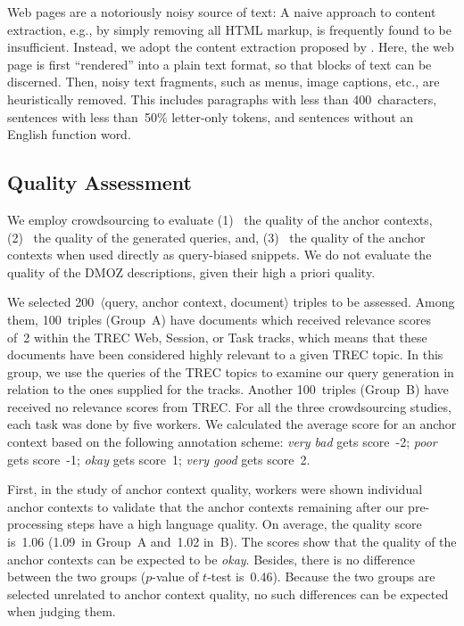 \documentclass[sigconf]{acmart}
\newcommand{\Ni}{(1)~}
\newcommand{\Nii}{(2)~}
\newcommand{\Niii}{(3)~}
\begin{document}
Web pages are a notoriously noisy source of text: A naive approach to content extraction, e.g., by simply removing all HTML markup, is frequently found to be insufficient. Instead, we adopt the content extraction proposed by \citet{kiesel:2017}. Here, the web page is first ``rendered'' into a plain text format, so that blocks of text can be discerned. Then, noisy text fragments, such as menus, image captions, etc., are heuristically removed. This includes paragraphs with less than 400~characters, sentences with less than~50\% letter-only tokens, and sentences without an English function word.

\subsection{Quality Assessment}

We employ crowdsourcing to evaluate
\Ni
the quality of the anchor contexts,
\Nii
the quality of the generated queries, and,
\Niii
the quality of the anchor contexts when used directly as query-biased snippets.
We do not evaluate the quality of the DMOZ descriptions, given their high a priori quality.

We selected 200~$\langle$query, anchor context, document$\rangle$ triples to be assessed. Among them, 100~triples (Group~A) have documents which received relevance scores of~2 within the TREC Web, Session, or Task tracks, which means that these documents have been considered highly relevant to a given TREC topic. In this group, we use the queries of the TREC topics to examine our query generation in relation to the ones supplied for the tracks. Another 100~triples (Group~B) have received no relevance scores from TREC. For all the three crowdsourcing studies, each task was done by five workers. We calculated the average score for an anchor context based on the following annotation scheme: \emph{very bad} gets score~-2; \emph{poor} gets score~-1; \emph{okay} gets score~1; \emph{very good} gets score~2.

First, in the study of anchor context quality, workers were shown individual anchor contexts to validate that the anchor contexts remaining after our pre-processing steps have a high language quality. On average, the quality score is~1.06 (1.09~in Group~A and~1.02 in~B). The scores show that the quality of the anchor contexts can be expected to be \emph{okay}. Besides, there is no difference between the two groups ($p$-value of $t$-test is~0.46). Because the two groups are selected unrelated to anchor context quality, no such differences can be expected when judging them.
\end{document}
